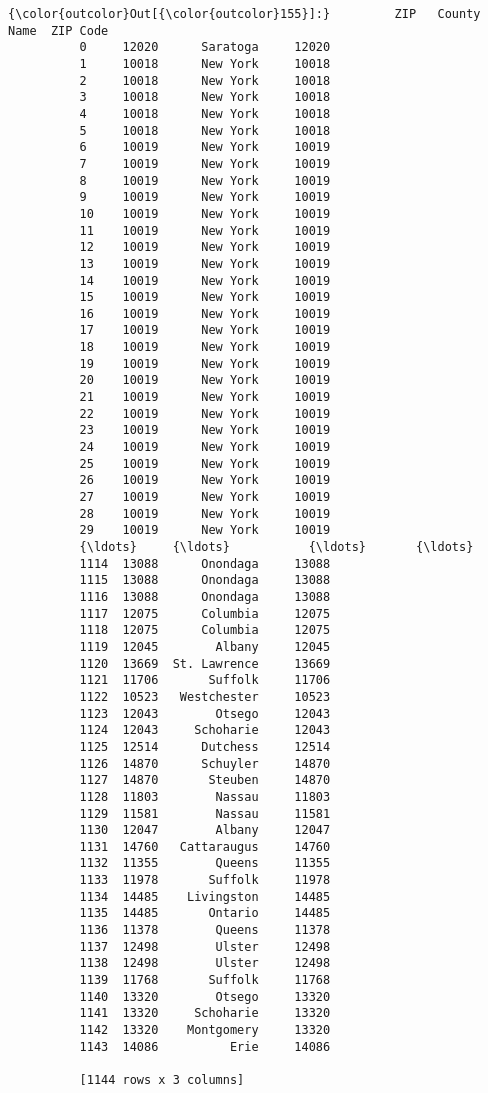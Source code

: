 \documentclass[11pt]{article}
\begin{document}
\begin{Verbatim}[commandchars=\\\{\}]
{\color{outcolor}Out[{\color{outcolor}155}]:}         ZIP   County Name  ZIP Code
          0     12020      Saratoga     12020
          1     10018      New York     10018
          2     10018      New York     10018
          3     10018      New York     10018
          4     10018      New York     10018
          5     10018      New York     10018
          6     10019      New York     10019
          7     10019      New York     10019
          8     10019      New York     10019
          9     10019      New York     10019
          10    10019      New York     10019
          11    10019      New York     10019
          12    10019      New York     10019
          13    10019      New York     10019
          14    10019      New York     10019
          15    10019      New York     10019
          16    10019      New York     10019
          17    10019      New York     10019
          18    10019      New York     10019
          19    10019      New York     10019
          20    10019      New York     10019
          21    10019      New York     10019
          22    10019      New York     10019
          23    10019      New York     10019
          24    10019      New York     10019
          25    10019      New York     10019
          26    10019      New York     10019
          27    10019      New York     10019
          28    10019      New York     10019
          29    10019      New York     10019
          {\ldots}     {\ldots}           {\ldots}       {\ldots}
          1114  13088      Onondaga     13088
          1115  13088      Onondaga     13088
          1116  13088      Onondaga     13088
          1117  12075      Columbia     12075
          1118  12075      Columbia     12075
          1119  12045        Albany     12045
          1120  13669  St. Lawrence     13669
          1121  11706       Suffolk     11706
          1122  10523   Westchester     10523
          1123  12043        Otsego     12043
          1124  12043     Schoharie     12043
          1125  12514      Dutchess     12514
          1126  14870      Schuyler     14870
          1127  14870       Steuben     14870
          1128  11803        Nassau     11803
          1129  11581        Nassau     11581
          1130  12047        Albany     12047
          1131  14760   Cattaraugus     14760
          1132  11355        Queens     11355
          1133  11978       Suffolk     11978
          1134  14485    Livingston     14485
          1135  14485       Ontario     14485
          1136  11378        Queens     11378
          1137  12498        Ulster     12498
          1138  12498        Ulster     12498
          1139  11768       Suffolk     11768
          1140  13320        Otsego     13320
          1141  13320     Schoharie     13320
          1142  13320    Montgomery     13320
          1143  14086          Erie     14086
          
          [1144 rows x 3 columns]
\end{Verbatim}
            
\end{document}
